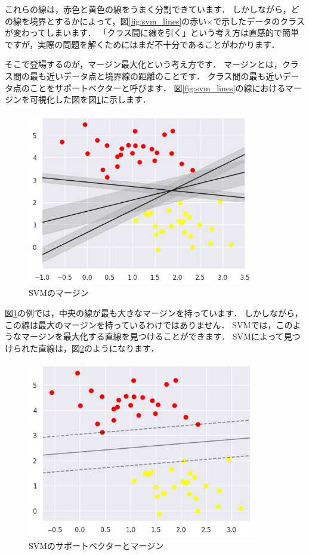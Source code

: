 \documentclass{jarticle}
\begin{document}
これらの線は，赤色と黄色の線をうまく分割できています．
しかしながら，どの線を境界とするかによって，図\ref{fig:svm_lines}の赤い$\times$で示したデータのクラスが変わってしまいます．
「クラス間に線を引く」という考え方は直感的で簡単ですが，実際の問題を解くためにはまだ不十分であることがわかります．

そこで登場するのが，マージン最大化という考え方です．
マージンとは，クラス間の最も近いデータ点と境界線の距離のことです．
クラス間の最も近いデータ点のことをサポートベクターと呼びます．
図\ref{fig:svm_lines}の線におけるマージンを可視化した図を図\ref{fig:svm_margin}に示します．

\begin{figure}[H]
  \centering
  \includegraphics[width=10cm]{fig/svm_margin.png}
  \caption{SVMのマージン}
  \label{fig:svm_margin}
\end{figure}

図\ref{fig:svm_margin}の例では，中央の線が最も大きなマージンを持っています．
しかしながら，この線は最大のマージンを持っているわけではありません．
SVMでは，このようなマージンを最大化する直線を見つけることができます．
SVMによって見つけられた直線は，図\ref{fig:svm_sv}のようになります．

\begin{figure}[H]
  \centering
  \includegraphics[width=10cm]{fig/svm_support_margin.png}
  \caption{SVMのサポートベクターとマージン}
  \label{fig:svm_sv}
\end{figure}
\end{document}

